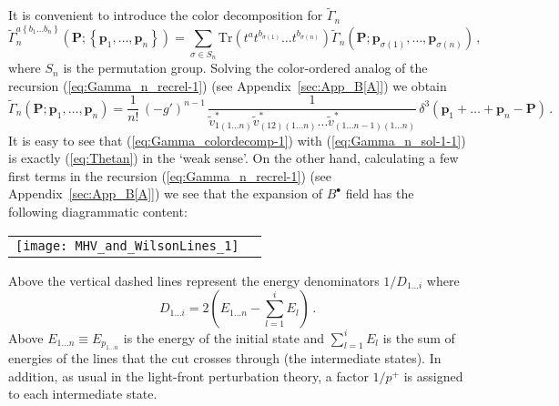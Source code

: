 \documentclass[english,american]{article}
\newcommand\myref{\refstepcounter{equation}\theequation}
\newcommand{\refmyref}[1]{\newcounter{#1}\setcounter{#1}{\theequation}}
\begin{document}
It is convenient to introduce the color decomposition for $\tilde{\Gamma}_{n}$
\begin{equation}
\tilde{\Gamma}_{n}^{a\left\{ b_{1}\dots b_{n}\right\} }\left(\mathbf{P};\left\{ \mathbf{p}_{1},\dots,\mathbf{p}_{n}\right\} \right)=\sum_{\sigma\in S_{n}}\mathrm{Tr}\left(t^{a}t^{b_{\sigma\left(1\right)}}\dots t^{b_{\sigma\left(n\right)}}\right)\tilde{\Gamma}_{n}\left(\mathbf{P};\mathbf{p}_{\sigma\left(1\right)},\dots,\mathbf{p}_{\sigma\left(n\right)}\right)\,,\label{eq:Gamma_colordecomp-1}
\end{equation}
where $S_{n}$ is the  permutation group. Solving the color-ordered analog
of the recursion (\ref{eq:Gamma_n_recrel-1}) (see Appendix~\ref{sec:App_B[A]})
we obtain
\begin{equation}
\tilde{\Gamma}_{n}\left(\mathbf{P};\mathbf{p}_{1},\dots,\mathbf{p}_{n}\right)=\frac{1}{n!}\,\left(-g'\right)^{n-1}\,\frac{1}{\tilde{v}_{1\left(1\dots n\right)}^{*}\tilde{v}_{\left(12\right)\left(1\dots n\right)}^{*}\dots\tilde{v}_{\left(1\dots n-1\right)\left(1\dots n\right)}^{*}}\,\delta^{3}\left(\mathbf{p}_{1}+\dots+\mathbf{p}_{n}-\mathbf{P}\right)\,.\label{eq:Gamma_n_sol-1-1}
\end{equation}
It is easy to see that (\ref{eq:Gamma_colordecomp-1}) with (\ref{eq:Gamma_n_sol-1-1})
is exactly (\ref{eq:Thetan}) in the `weak sense'. 
On the other hand, calculating a few first terms in the recursion
(\ref{eq:Gamma_n_recrel-1}) (see Appendix~\ref{sec:App_B[A]}) we
see that the expansion of $B^{\bullet}$ field has the following diagrammatic
content: 

\begin{flushleft}
\begin{tabular}{>{\centering}m{}>{\centering}m{}}
\bigskip{}


\centerline{\texttt{[image: MHV\_and\_WilsonLines\_1]}} & \centering{}\centering{(\myref )}
\refmyref{B+_diags}\tabularnewline
\end{tabular}
\par\end{flushleft}

\noindent Above the vertical dashed lines represent the energy denominators
$1/D_{1\dots i}$ where
\begin{equation}
D_{1\dots i}=2\left(E_{1\dots n}-\sum_{l=1}^{i}E_{l}\right)\,.\label{eq:Energy_denom}
\end{equation}
Above $E_{1\dots n}\equiv E_{p_{1\dots n}}$ is the energy of the
initial state and $\sum_{l=1}^{i}E_{l}$ is the sum of energies of
the lines that the cut crosses through (the intermediate states). In addition,
as usual in the light-front perturbation theory, a factor $1/p^{+}$
is assigned to each intermediate state.
\end{document}
